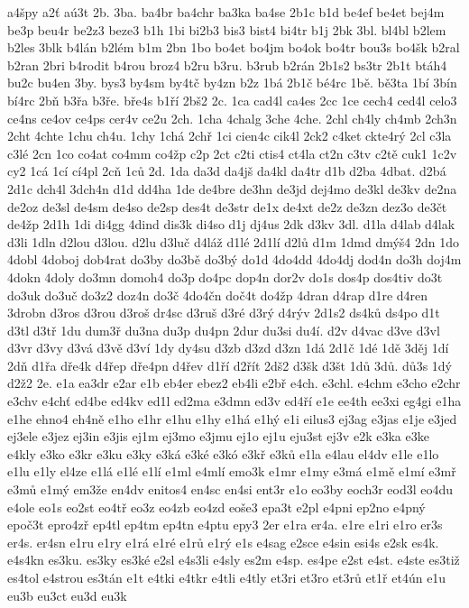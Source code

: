 {a4špy
a2ť
aú3t
2b.
3ba.
ba4br
ba4chr
ba3ka
ba4se
2b1c
b1d
be4ef
be4et
bej4m
be3p
beu4r
be2z3
beze3
b1h
1bi
bi2b3
bis3
bist4
bi4tr
b1j
2bk
3bl.
bl4bl
b2lem
b2les
3blk
b4lán
b2lém
b1m
2bn
1bo
bo4et
bo4jm
bo4ok
bo4tr
bou3s
bo4šk
b2ral
b2ran
2bri
b4rodit
b4rou
broz4
b2ru
b3ru.
b3rub
b2rán
2b1s2
bs3tr
2b1t
btáh4
bu2c
bu4en
3by.
bys3
by4sm
by4tč
by4zn
b2z
1bá
2b1č
bé4rc
1bě.
bě3ta
1bí
3bín
bí4rc
2bň
b3řa
b3ře.
bře4s
b1ří
2bš2
2c.
1ca
cad4l
ca4es
2cc
1ce
cech4
ced4l
celo3
ce4ns
ce4ov
ce4ps
cer4v
ce2u
2ch.
1cha
4chalg
3che
4che.
2chl
ch4ly
ch4mb
2ch3n
2cht
4chte
1chu
ch4u.
1chy
1chá
2chř
1ci
cien4c
cik4l
2ck2
c4ket
ckte4rý
2cl
c3la
c3lé
2cn
1co
co4at
co4mm
co4žp
c2p
2ct
c2ti
ctis4
ct4la
ct2n
c3tv
c2tě
cuk1
1c2v
cy2
1cá
1cí
cí4pl
2cň
1ců
2d.
1da
da3d
da4jš
da4kl
da4tr
d1b
d2ba
4dbat.
d2bá
2d1c
dch4l
3dch4n
d1d
dd4ha
1de
de4bre
de3hn
de3jd
dej4mo
de3kl
de3kv
de2na
de2oz
de3sl
de4sm
de4so
de2sp
des4t
de3str
de1x
de4xt
de2z
de3zn
dez3o
de3čt
de4žp
2d1h
1di
di4gg
4dind
dis3k
di4so
d1j
dj4us
2dk
d3kv
3dl.
d1la
d4lab
d4lak
d3li
1dln
d2lou
d3lou.
d2lu
d3luč
d4láž
d1lé
2d1lí
d2lů
d1m
1dmd
dmýš4
2dn
1do
4dobl
4doboj
dob4rat
do3by
do3bě
do3bý
do1d
4do4dd
4do4dj
dod4n
do3h
doj4m
4dokn
4doly
do3mn
domoh4
do3p
do4pc
dop4n
dor2v
do1s
dos4p
dos4tiv
do3t
do3uk
do3uč
do3z2
doz4n
do3č
4do4čn
doč4t
do4žp
4dran
d4rap
d1re
d4ren
3drobn
d3ros
d3rou
d3roš
dr4sc
d3ruš
d3ré
d3rý
d4rýv
2d1s2
ds4ků
ds4po
d1t
d3tl
d3tř
1du
dum3ř
du3na
du3p
du4pn
2dur
du3si
du4í.
d2v
d4vac
d3ve
d3vl
d3vr
d3vy
d3vá
d3vě
d3ví
1dy
dy4su
d3zb
d3zd
d3zn
1dá
2d1č
1dé
1dě
3děj
1dí
2dň
d1řa
dře4k
d4řep
dře4pn
d4řev
d1ří
d2řít
2dš2
d3šk
d3št
1dů
3dů.
dů3s
1dý
d2ž2
2e.
e1a
ea3dr
e2ar
e1b
eb4er
ebez2
eb4li
e2bř
e4ch.
e3chl.
e4chm
e3cho
e2chr
e3chv
e4chť
ed4be
ed4kv
ed1l
ed2ma
e3dmn
ed3v
ed4ří
e1e
ee4th
ee3xi
eg4gi
e1ha
e1he
ehno4
eh4ně
e1ho
e1hr
e1hu
e1hy
e1há
e1hý
e1i
eilus3
ej3ag
e3jas
e1je
e3jed
ej3ele
e3jez
ej3in
e3jis
ej1m
ej3mo
e3jmu
ej1o
ej1u
eju3st
ej3v
e2k
e3ka
e3ke
e4kly
e3ko
e3kr
e3ku
e3ky
e3ká
e3ké
e3kó
e3kř
e3ků
e1la
e4lau
el4dv
e1le
e1lo
e1lu
e1ly
el4ze
e1lá
e1lé
e1lí
e1ml
e4mlí
emo3k
e1mr
e1my
e3má
e1mě
e1mí
e3mř
e3mů
e1mý
em3že
en4dv
enitos4
en4sc
en4si
ent3r
e1o
eo3by
eoch3r
eod3l
eo4du
e4ole
eo1s
eo2st
eo4tř
eo3z
eo4zb
eo4zd
eoše3
epa3t
e2pl
e4pni
ep2no
e4pný
epoč3t
epro4zř
ep4tl
ep4tm
ep4tn
e4ptu
epy3
2er
e1ra
er4a.
e1re
e1ri
e1ro
er3s
er4s.
er4sn
e1ru
e1ry
e1rá
e1ré
e1rů
e1rý
e1s
e4sag
e2sce
e4sin
esi4s
e2sk
es4k.
e4s4kn
es3ku.
es3ky
es3ké
e2sl
e4s3li
e4sly
es2m
e4sp.
es4pe
e2st
e4st.
e4ste
es3tiž
es4tol
e4strou
es3tán
e1t
e4tki
e4tkr
e4tli
e4tly
et3ri
et3ro
et3rů
et1ř
et4ún
e1u
eu3b
eu3ct
eu3d
eu3k
}
